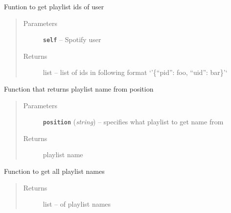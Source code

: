 \documentclass[letterpaper,10pt,english]{sphinxmanual}
\begin{document}
\begin{fulllineitems}
\begin{fulllineitems}
\label{index:gitsound.SpotifyUser.get_playlist_ids}
Funtion to get playlist ids of user
\begin{quote}\begin{description}
\item[{Parameters}] \leavevmode
\textbf{\texttt{self}} -- Spotify user

\item[{Returns}] \leavevmode
list -- list of ids in following format `'\{``pid'': foo, ``uid'': bar\}'`

\end{description}\end{quote}

\end{fulllineitems}


\begin{fulllineitems}
\label{index:gitsound.SpotifyUser.get_playlist_name}
Function that returns playlist name from position
\begin{quote}\begin{description}
\item[{Parameters}] \leavevmode
\textbf{\texttt{position}} (\emph{string}) -- specifies what playlist to get name from

\item[{Returns}] \leavevmode
playlist name

\end{description}\end{quote}

\end{fulllineitems}


\begin{fulllineitems}
\label{index:gitsound.SpotifyUser.get_playlist_names}
Function to get all playlist names
\begin{quote}\begin{description}
\item[{Returns}] \leavevmode
list -- of playlist names

\end{description}\end{quote}


\end{fulllineitems}
\end{fulllineitems}
\end{document}

